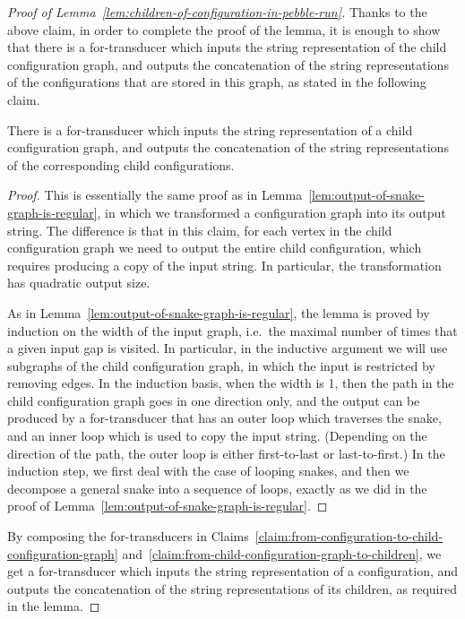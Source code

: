 \begin{proof}[Proof of Lemma~\ref{lem:children-of-configuration-in-pebble-run}]
Thanks to the above claim, in order to complete the proof of the lemma, it is enough to show that there is a for-transducer which inputs the string representation of the child configuration graph, and outputs the concatenation of the string representations of the configurations that are stored in this graph, as stated in the following claim. 

    \begin{claim}\label{claim:from-child-configuration-graph-to-children}
            There is a for-transducer which inputs the string representation of a child configuration graph, and outputs the  concatenation of the string representations of the corresponding child configurations. 
    \end{claim}
    \begin{proof} This is essentially the same proof as in Lemma~\ref{lem:output-of-snake-graph-is-regular}, in which we transformed a configuration graph into its output string. The difference is that in this claim, for each vertex in the child configuration graph we need to output the entire child configuration, which requires producing a copy of the input string. In particular, the transformation has quadratic output size.

        As in Lemma~\ref{lem:output-of-snake-graph-is-regular}, the lemma is proved by induction on the width of the input graph, i.e.~the maximal number of times that a given input gap is visited. In particular, in the inductive argument we will use subgraphs of the child configuration graph, in which the input is restricted by removing  edges.  In the induction basis, when the width is 1, then the path in the child configuration graph goes in one direction only, and the output can be produced by  a for-transducer that has an outer loop which traverses the snake, and an inner loop which is used to copy the input string. (Depending on the direction of the path, the outer loop is either first-to-last or last-to-first.) In the induction step, we first deal with the case of looping snakes, and then we decompose a general snake into a sequence of loops, exactly as we did in the proof of Lemma~\ref{lem:output-of-snake-graph-is-regular}.
    \end{proof}
By composing the for-transducers in Claims~\ref{claim:from-configuration-to-child-configuration-graph} and~\ref{claim:from-child-configuration-graph-to-children}, we get a for-transducer which inputs the string representation of a configuration, and outputs the concatenation of the string representations of its children, as required in the lemma.
\end{proof}





